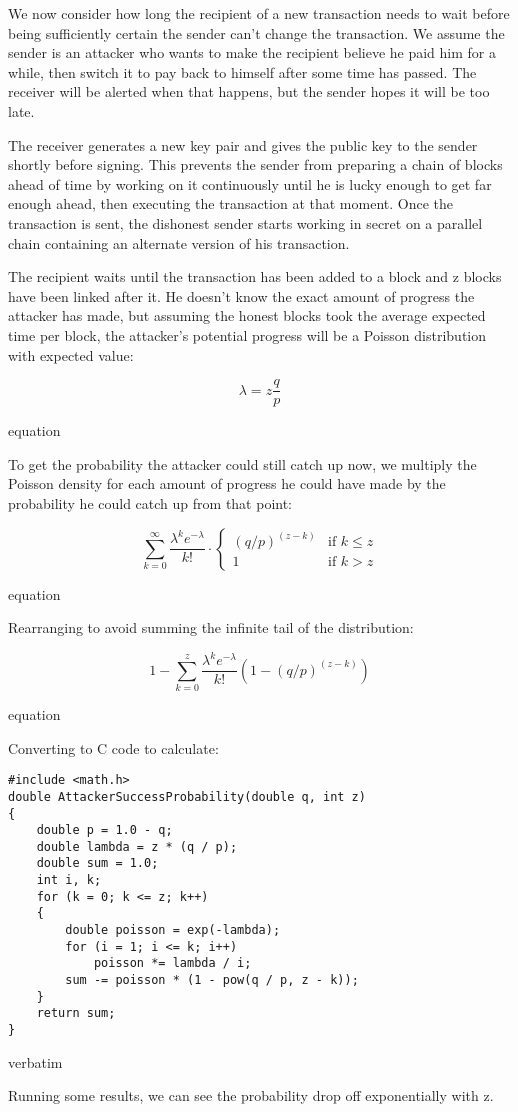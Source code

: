 We now consider how long the recipient of a new transaction needs to wait before being sufficiently certain the sender can't change the transaction. We assume the sender is an attacker who wants to make the recipient believe he paid him for a while, then switch it to pay back to himself after some time has passed. The receiver will be alerted when that happens, but the sender hopes it will be too late.

The receiver generates a new key pair and gives the public key to the sender shortly before signing. This prevents the sender from preparing a chain of blocks ahead of time by working on it continuously until he is lucky enough to get far enough ahead, then executing the transaction at that moment. Once the transaction is sent, the dishonest sender starts working in secret on a parallel chain containing an alternate version of his transaction.

The recipient waits until the transaction has been added to a block and z blocks have been linked after it. He doesn't know the exact amount of progress the attacker has made, but assuming the honest blocks took the average expected time per block, the attacker's potential progress will be a Poisson distribution with expected value:

\begin{equation}
\lambda = z \frac{q}{p}
\end{equation}

equation

To get the probability the attacker could still catch up now, we multiply the Poisson density for each amount of progress he could have made by the probability he could catch up from that point:

\begin{equation}
\sum_{k=0}^{\infty} \frac{\lambda^k e^{-\lambda}}{k!} \cdot
\begin{cases}
(q/p)^{(z-k)} & \text{if } k \leq z \\
1 & \text{if } k > z
\end{cases}
\end{equation}

equation

Rearranging to avoid summing the infinite tail of the distribution:

\begin{equation}
1 - \sum_{k=0}^{z} \frac{\lambda^k e^{-\lambda}}{k!} \left(1-(q/p)^{(z-k)}\right)
\end{equation}

equation

Converting to C code to calculate:

\begin{verbatim}
#include <math.h>
double AttackerSuccessProbability(double q, int z)
{
    double p = 1.0 - q;
    double lambda = z * (q / p);
    double sum = 1.0;
    int i, k;
    for (k = 0; k <= z; k++)
    {
        double poisson = exp(-lambda);
        for (i = 1; i <= k; i++)
            poisson *= lambda / i;
        sum -= poisson * (1 - pow(q / p, z - k));
    }
    return sum;
}
\end{verbatim}

verbatim

Running some results, we can see the probability drop off exponentially with z.